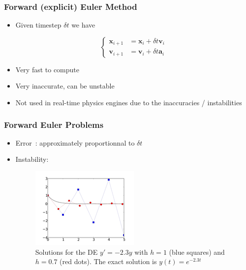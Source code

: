 \documentclass{beamer}
\begin{document}
\begin{frame}
  \frametitle{Forward (explicit) Euler Method}

  \begin{itemize}
  \item Given timestep $\delta t$ we have

    $$
    \begin{cases}
      \mathbf{x}_{i+1} &= \mathbf{x}_i + \delta t \mathbf{v}_i\\
      \mathbf{v}_{i+1} &= \mathbf{v}_i + \delta t \mathbf{a}_i
    \end{cases}
    $$
    \pause
  \item Very fast to compute
    \pause
  \item Very inaccurate, can be unstable
  \item Not used in real-time physics engines due to the inaccuracies / instabilities
  \end{itemize}
\end{frame}



\begin{frame}
  \frametitle{Forward Euler Problems}

  \begin{itemize}
  \item Error~: approximately proportionnal to $\delta t$
    \pause
  \item Instability:~\\
    \begin{figure}[p]
      \centering
      \includegraphics[width=0.5\linewidth]{instability.png}
      \caption{Solutions for the DE $y' = -2.3y$ with $h=1$ (blue squares) and $h=0.7$ (red dots).
        The exact solution is $y(t) = e^{-2.3t}$}
    \end{figure}
  \end{itemize} 
\end{frame}
\end{document}
